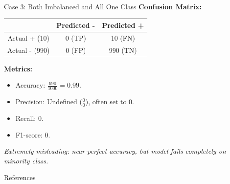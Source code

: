 \documentclass{beamer}
\begin{document}
\begin{frame}{Case 3: Both Imbalanced and All One Class}
  \textbf{Confusion Matrix:}
  \begin{table}[h]
    \centering
    \begin{tabular}{|c|c|c|}
      \hline
      & Predicted - & Predicted + \\
      \hline
      Actual + (10) & 0 (TP) & 10 (FN) \\
      \hline
      Actual - (990) & 0 (FP) & 990 (TN) \\
      \hline
    \end{tabular}
  \end{table}
  \textbf{Metrics:}
  \begin{itemize}
    \item Accuracy: \( \frac{990}{1000} = 0.99 \).
    \item Precision: Undefined (\( \frac{0}{0} \)), often set to 0.
    \item Recall: \( 0 \).
    \item F1-score: \( 0 \).
  \end{itemize}
  \textit{\small{Extremely misleading: near-perfect accuracy, but model fails completely on minority class.}}
\end{frame}


\begin{frame}{References}


\end{frame}
\end{document}
